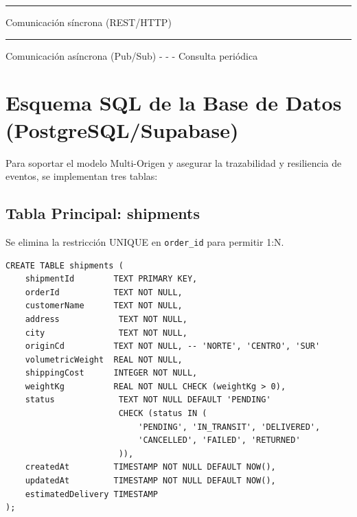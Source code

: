 \documentclass[11pt, a4paper]{article}
\begin{document}
\begin{center}
\end{center}

\vspace{0.5cm}
\begin{center}
{\footnotesize
  \textcolor{info}{\rule{0.6cm}{2pt}} Comunicación síncrona (REST/HTTP) \qquad
  \textcolor{success}{\rule{0.6cm}{2pt}} Comunicación asíncrona (Pub/Sub) \qquad
  \textcolor{info}{- - -} Consulta periódica
}
\end{center}


\section{Esquema SQL de la Base de Datos (PostgreSQL/Supabase)}

Para soportar el modelo Multi-Origen y asegurar la trazabilidad y resiliencia de eventos, se implementan tres tablas:

\subsection{Tabla Principal: shipments}
Se elimina la restricción UNIQUE en \texttt{order\_id} para permitir 1:N.

\begin{lstlisting}
CREATE TABLE shipments (
    shipmentId        TEXT PRIMARY KEY,
    orderId           TEXT NOT NULL,
    customerName      TEXT NOT NULL,
    address            TEXT NOT NULL,
    city               TEXT NOT NULL,
    originCd          TEXT NOT NULL, -- 'NORTE', 'CENTRO', 'SUR'
    volumetricWeight  REAL NOT NULL,
    shippingCost      INTEGER NOT NULL,
    weightKg          REAL NOT NULL CHECK (weightKg > 0),
    status             TEXT NOT NULL DEFAULT 'PENDING'
                       CHECK (status IN (
                           'PENDING', 'IN_TRANSIT', 'DELIVERED',
                           'CANCELLED', 'FAILED', 'RETURNED'
                       )),
    createdAt         TIMESTAMP NOT NULL DEFAULT NOW(),
    updatedAt         TIMESTAMP NOT NULL DEFAULT NOW(),
    estimatedDelivery TIMESTAMP
);
\end{lstlisting}
\end{document}
